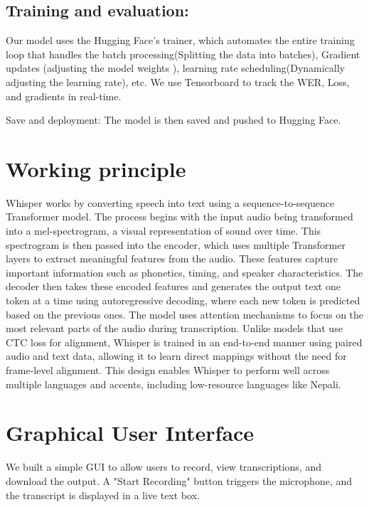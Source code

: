 \subsection{Training and evaluation:} Our model uses the Hugging Face's trainer, which automates the entire training loop that handles the batch processing(Splitting the data into batches), Gradient updates (adjusting the model weights ), learning rate scheduling(Dynamically adjusting the learning rate), etc. We use Tensorboard to track the WER, Loss, and gradients in real-time.

Save and deployment: The model is then saved and pushed to Hugging Face. 

\section{Working principle}
Whisper works by converting speech into text using a sequence-to-sequence Transformer model. The process begins with the input audio being transformed into a mel-spectrogram, a visual representation of sound over time. This spectrogram is then passed into the encoder, which uses multiple Transformer layers to extract meaningful features from the audio. These features capture important information such as phonetics, timing, and speaker characteristics. The decoder then takes these encoded features and generates the output text one token at a time using autoregressive decoding, where each new token is predicted based on the previous ones. The model uses attention mechanisms to focus on the most relevant parts of the audio during transcription. Unlike models that use CTC loss for alignment, Whisper is trained in an end-to-end manner using paired audio and text data, allowing it to learn direct mappings without the need for frame-level alignment. This design enables Whisper to perform well across multiple languages and accents, including low-resource languages like Nepali.





\section{Graphical User Interface}
We built a simple GUI to allow users to record, view transcriptions, and download the output. A "Start Recording" button triggers the microphone, and the transcript is displayed in a live text box.

